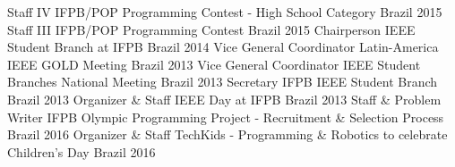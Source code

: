\begin{cvhonors}
  \cvhonor
    {Staff} %
    {IV IFPB/POP Programming Contest - High School Category} %
    {Brazil} %
    {2015} %
  \cvhonor
    {Staff} %
    {III IFPB/POP Programming Contest} %
    {Brazil} %
    {2015} %
  \cvhonor
    {Chairperson} %
    {IEEE Student Branch at IFPB} %
    {Brazil} %
    {2014} %
  \cvhonor
    {Vice General Coordinator} %
    {Latin-America IEEE GOLD Meeting} %
    {Brazil} %
    {2013} %
  \cvhonor
    {Vice General Coordinator} %
    {IEEE Student Branches National Meeting} %
    {Brazil} %
    {2013} %
  \cvhonor
    {Secretary} %
    {IFPB IEEE Student Branch} %
    {Brazil} %
    {2013} %
\cvhonor
    {Organizer \& Staff} %
    {IEEE Day at IFPB} %
    {Brazil} %
    {2013} %
  \cvhonor
    {Staff \& Problem Writer} %
    {IFPB Olympic Programming Project - Recruitment \& Selection Process} %
    {Brazil} %
    {2016} %
  \cvhonor
    {Organizer \& Staff} %
    {TechKids - Programming \& Robotics to celebrate Children's Day} %
    {Brazil} %
    {2016} %
\end{cvhonors}
